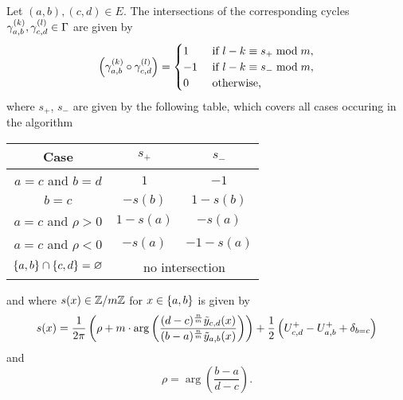 \documentclass[main.tex]{subfiles}
\begin{document}
  \begin{thm}\label{thm:intsec_numb}
      Let $(a,b),(c,d) \in E$. The intersections of the corresponding cycles $\gamma_{a,b}^{(k)}, \gamma_{c,d}^{(l)} \in \Gamma$ are given by
      \begin{equation}
          \left(\gamma_{a,b}^{(k)} \circ \gamma_{c,d}^{(l)}\right)
          = \begin{cases}
              1  &\text{ if } l-k \equiv s_+ \bmod m,\\
              -1 &\text{ if } l-k \equiv s_- \bmod m,\\
              0 &\text{ otherwise,}
          \end{cases}
      \end{equation}
      where $s_+$, $s_-$ are given by the following table, which covers all
      cases occuring in the algorithm
      \begin{center}
      \begin{tabular}{ccc}
          \toprule
          Case
          & $s_+$ & $s_-$ \\
          \midrule
          $a=c$ and $b=d$
          & $1$ & $-1$ \\
          $b=c$
          & $-s(b)$ & $1-s(b)$ \\
          $a=c$ and $\rho>0$
          & $1-s(a)$ & $-s(a)$ \\
          $a=c$ and $\rho<0$
          & $-s(a)$ & $-1-s(a)$\\
          $\left\{a,b\right\}\cap\left\{c,d\right\}=\varnothing$ & \multicolumn{2}{c}{no intersection} \\
          \bottomrule
      \end{tabular}
      \end{center}
      and where $s(x)\in\mathbb{Z}/m\mathbb{Z}$ for $x\in\left\{a,b\right\}$ is given by
      \begin{equation}
	    s(x) = \frac{1}{2\pi}\left( \rho + m \cdot \arg \left( \frac{(d-c)^{\frac{n}{m}}\tilde{y}_{c,d}(x)}{(b-a)^{\frac{n}{m}}\tilde{y}_{a,b}(x)} \right) \right) + \frac{1}{2}
	    \left( U_{c,d}^+ - U_{a,b}^+
	    + \delta_{b=c}\right)
      \end{equation}
     and
      \begin{equation}
          \rho = \arg \left( \frac{b-a}{d-c} \right).
      \end{equation}
 \end{thm}

\end{document}
